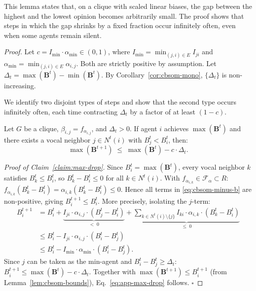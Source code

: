 \geomDecay*

This lemma states that, on a clique with scaled linear biases, the gap
between the highest and the lowest opinion becomes arbitrarily small. The
proof shows that steps in which the gap shrinks by a fixed fraction occur
infinitely often, even when some agents remain silent.

\begin{proof}\label{proof:geom-decay}
  Let $c=I_{\min}\cdot\alpha_{\min}\in(0,1)$,
  where $I_{\min}=\min_{(j,i)\in E}I_{ji}$ and
  $\alpha_{\min}=\min_{(j,i)\in E}\alpha_{i,j}$.
  Both are strictly positive by assumption.
  Let $\Delta_t=\max(\mathbf{B}^t)-\min(\mathbf{B}^t)$.
  By Corollary~\ref{cor:cbsom-mono}, $\{\Delta_t\}$ is non-increasing.

  We identify two disjoint types of steps and show that the second
  type occurs infinitely often, each time contracting $\Delta_t$ by a
  factor of at least $(1-c)$.

  \medskip
  \begin{pclaim}
  \label{claim:max-drop}
    Let $G$ be a clique, $\beta_{i,j}=f_{\alpha_{i,j}}$, and
    $\Delta_t>0$.  If agent $i$ achieves $\max(\mathbf{B}^t)$ and
    there exists a vocal neighbor $j\in N^t(i)$ with
    $B_j^t < B_i^t$, then:
    \begin{equation}\label{eq:app-max-drop}
      \max(\mathbf{B}^{t+1})
      \;\le\;
      \max(\mathbf{B}^t) - c\cdot \Delta_t.
    \end{equation}
  \end{pclaim}

  \noindent\emph{Proof of Claim~\ref{claim:max-drop}.}
  Since $B_i^t=\max(\mathbf{B}^t)$, every vocal neighbor $k$ satisfies
  $B_k^t\le B_i^t$, so $B_k^t-B_i^t\le 0$ for all $k\in N^t(i)$.
  With $f_{\alpha_{i,k}}\in\mathcal{F}_\alpha\subset R$:
  $f_{\alpha_{i,k}}(B_k^t-B_i^t)=\alpha_{i,k}(B_k^t-B_i^t)\le 0$.
  Hence all terms in \eqref{eq:cbsom-minus-b} are non-positive, giving
  $B_i^{t+1}\le B_i^t$.  More precisely, isolating the $j$-term:
  \begin{align*}
    B_i^{t+1}
    &= B_i^t
      + \underbrace{I_{ji}\cdot\alpha_{i,j}\cdot(B_j^t-B_i^t)}_{<\;0}
      + \underbrace{\sum_{k\in N^t(i)\setminus\{j\}}
          I_{ki}\cdot\alpha_{i,k}\cdot(B_k^t-B_i^t)}_{\le\;0}\\
    &\le B_i^t - I_{ji}\cdot\alpha_{i,j}\cdot(B_i^t-B_j^t)\\
    &\le B_i^t - I_{\min}\cdot\alpha_{\min}\cdot(B_i^t-B_j^t).
  \end{align*}
  Since $j$ can be taken as the min-agent and
  $B_i^t-B_j^t\ge \Delta_t$:
  $B_i^{t+1}\le \max(\mathbf{B}^t)-c\cdot \Delta_t$.
  Together with $\max(\mathbf{B}^{t+1})\le B_i^{t+1}$
  (from Lemma~\ref{lem:cbsom-bounds}), Eq.~\eqref{eq:app-max-drop}
  follows. \hfill$\square$


\end{proof}
